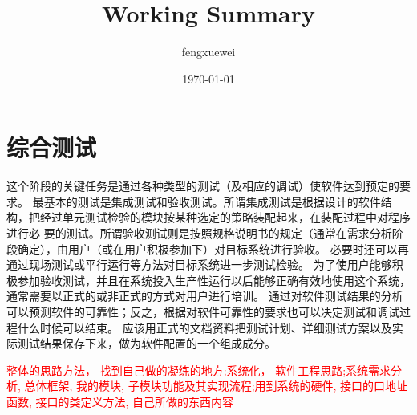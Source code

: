 \documentclass[UTF8,a4paper,10pt,nocolorlinks]{ctexbook}
\title{
    \huge{\textbf{Working Summary}}
}
\author{fengxuewei}
\date{\today}
\begin{document}
    \tableofcontents
    \pagestyle{teststyle}  
  
  \clearpage
  
  \clearpage
  
  \clearpage

    \section{综合测试}
    
    这个阶段的关键任务是通过各种类型的测试（及相应的调试）使软件达到预定的要求。
    最基本的测试是集成测试和验收测试。所谓集成测试是根据设计的软件结构，把经过单元测试检验的模块按某种选定的策略装配起来，在装配过程中对程序进行必 要的测试。所谓验收测试则是按照规格说明书的规定（通常在需求分析阶段确定），由用户（或在用户积极参加下）对目标系统进行验收。
    必要时还可以再通过现场测试或平行运行等方法对目标系统进一步测试检验。
    为了使用户能够积极参加验收测试，并且在系统投入生产性运行以后能够正确有效地使用这个系统，通常需要以正式的或非正式的方式对用户进行培训。
    通过对软件测试结果的分析可以预测软件的可靠性；反之，根据对软件可靠性的要求也可以决定测试和调试过程什么时候可以结束。
    应该用正式的文档资料把测试计划、详细测试方案以及实际测试结果保存下来，做为软件配置的一个组成成分。

    \textcolor{red}{整体的思路方法， 找到自己做的凝练的地方;系统化， 软件工程思路;系统需求分析, 总体框架, 我的模块, 子模块功能及其实现流程;用到系统的硬件, 接口的口地址函数, 接口的类定义方法, 自己所做的东西内容}
\end{document}
